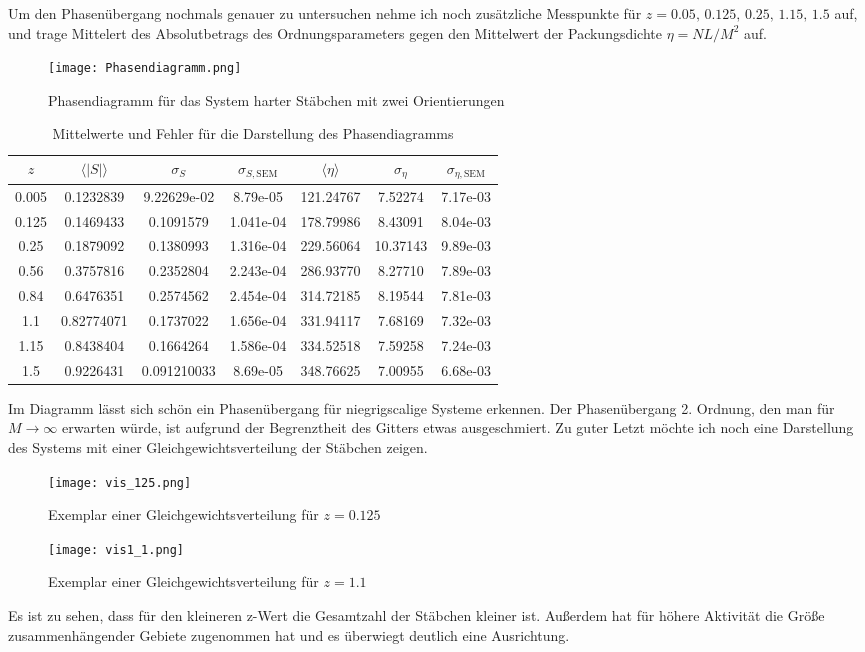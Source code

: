 \documentclass[12pt]{article}
\begin{document}
Um den Phasenübergang nochmals genauer zu untersuchen nehme ich noch zusätzliche Messpunkte für $z=0.05,\,0.125,\,0.25,\,1.15,\,1.5$ auf, und trage Mittelert des Absolutbetrags des Ordnungsparameters gegen den Mittelwert der Packungsdichte $\eta=NL/M^2$ auf.
\begin{figure}[H]\centering\texttt{[image: Phasendiagramm.png]}\caption{Phasendiagramm für das System harter Stäbchen mit zwei Orientierungen}\end{figure}

\begin{table}[H]\centering\begin{tabular}{c|c|c|c|c|c|c}
   $z$ &$\langle{|S|}\rangle$&$\sigma_S$&$\sigma_{S,\text{SEM}}$&$\langle{\eta}\rangle$&$\sigma_\eta$&$\sigma_{\eta,\text{SEM}}$\\\hline\hline
  0.005&  0.1232839&9.22629e-02&8.79e-05&121.24767&
 7.52274&7.17e-03\\
 0.125&0.1469433&0.1091579&1.041e-04&178.79986&
 8.43091&8.04e-03\\
 0.25&0.1879092&0.1380993&1.316e-04&229.56064&
 10.37143&9.89e-03\\
 0.56&0.3757816&0.2352804&2.243e-04&286.93770&
 8.27710&7.89e-03\\
 0.84&0.6476351&0.2574562&2.454e-04&314.72185&
 8.19544&7.81e-03\\
 1.1&0.82774071&0.1737022&1.656e-04&331.94117&
 7.68169&7.32e-03\\
 1.15&0.8438404&0.1664264&1.586e-04&334.52518&
 7.59258&7.24e-03\\
 1.5&0.9226431&0.091210033&8.69e-05&348.76625&
 7.00955&6.68e-03\\
\end{tabular}
\caption{Mittelwerte und Fehler für die Darstellung des Phasendiagramms}
\end{table}
Im Diagramm lässt sich schön ein Phasenübergang für niegrigscalige Systeme erkennen. Der Phasenübergang 2. Ordnung, den man für $M\rightarrow\infty$ erwarten würde, ist aufgrund der Begrenztheit des Gitters etwas ausgeschmiert.\newpage
Zu guter Letzt möchte ich noch eine Darstellung des Systems mit einer Gleichgewichtsverteilung der Stäbchen zeigen.
\begin{figure}[H]\centering\texttt{[image: vis\_125.png]}\caption{Exemplar einer Gleichgewichtsverteilung für $z=0.125$}\end{figure}
\begin{figure}[H]\centering\texttt{[image: vis1\_1.png]}\caption{Exemplar einer Gleichgewichtsverteilung für $z=1.1$}\end{figure}
Es ist zu sehen, dass für den kleineren z-Wert die Gesamtzahl der Stäbchen kleiner ist. Außerdem hat für höhere Aktivität die Größe zusammenhängender Gebiete zugenommen hat und es überwiegt deutlich eine Ausrichtung.
\end{document}
